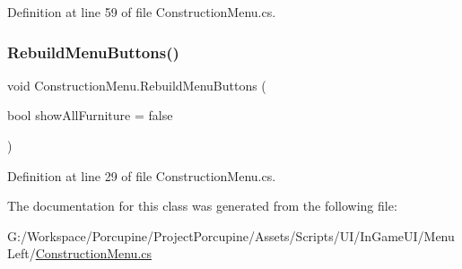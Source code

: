 Definition at line 59 of file Construction\+Menu.\+cs.

\mbox{\label{class_construction_menu_aad168bb3fd4e26cb7a814352cae8bbeb}} 
\subsubsection{\texorpdfstring{Rebuild\+Menu\+Buttons()}{RebuildMenuButtons()}}
{\footnotesize\ttfamily void Construction\+Menu.\+Rebuild\+Menu\+Buttons (\begin{DoxyParamCaption}\item[{bool}]{show\+All\+Furniture = {\ttfamily false} }\end{DoxyParamCaption})}



Definition at line 29 of file Construction\+Menu.\+cs.



The documentation for this class was generated from the following file\+:\begin{DoxyCompactItemize}
\item 
G\+:/\+Workspace/\+Porcupine/\+Project\+Porcupine/\+Assets/\+Scripts/\+U\+I/\+In\+Game\+U\+I/\+Menu\+Left/\hyperlink{_construction_menu_8cs}{Construction\+Menu.\+cs}\end{DoxyCompactItemize}
